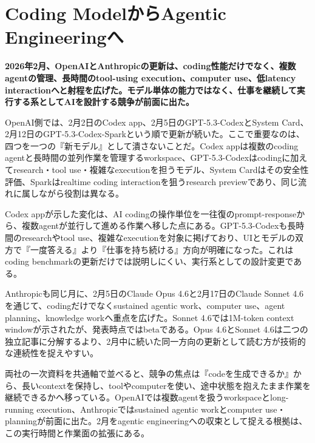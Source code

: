 \section{Coding ModelからAgentic Engineeringへ}
\label{pkg:agentic-engineering-frontier}
\noindent\textbf{2026年2月、OpenAIとAnthropicの更新は、coding性能だけでなく、複数agentの管理、長時間のtool-using execution、computer use、低latency interactionへと射程を広げた。モデル単体の能力ではなく、仕事を継続して実行する系としてAIを設計する競争が前面に出た。}\autocite{src-15823ae5556e,src-9aba7995b6a5,src-f6aa679babd7}

OpenAI側では、2月2日のCodex app、2月5日のGPT-5.3-CodexとSystem Card、2月12日のGPT-5.3-Codex-Sparkという順で更新が続いた。ここで重要なのは、四つを一つの『新モデル』として潰さないことだ。Codex appは複数のcoding agentと長時間の並列作業を管理するworkspace、GPT-5.3-Codexはcodingに加えてresearch・tool use・複雑なexecutionを担うモデル、System Cardはその安全性評価、Sparkはrealtime coding interactionを狙うresearch previewであり、同じ流れに属しながら役割は異なる。\autocite{src-15823ae5556e,src-4a841ea7ec7c,src-9aba7995b6a5,src-dd64fe3084a4}


Codex appが示した変化は、AI codingの操作単位を一往復のprompt-responseから、複数agentが並行して進める作業へ移した点にある。GPT-5.3-Codexも長時間のresearchやtool use、複雑なexecutionを対象に掲げており、UIとモデルの双方で『一度答える』より『仕事を持ち続ける』方向が明確になった。これはcoding benchmarkの更新だけでは説明しにくい、実行系としての設計変更である。\autocite{src-15823ae5556e,src-9aba7995b6a5}


Anthropicも同じ月に、2月5日のClaude Opus 4.6と2月17日のClaude Sonnet 4.6を通じて、codingだけでなくsustained agentic work、computer use、agent planning、knowledge workへ重点を広げた。Sonnet 4.6では1M-token context windowが示されたが、発表時点ではbetaである。Opus 4.6とSonnet 4.6は二つの独立記事に分解するより、2月中に続いた同一方向の更新として読む方が技術的な連続性を捉えやすい。\autocite{src-f6aa679babd7}


両社の一次資料を共通軸で並べると、競争の焦点は『codeを生成できるか』から、長いcontextを保持し、toolやcomputerを使い、途中状態を抱えたまま作業を継続できるかへ移っている。OpenAIでは複数agentを扱うworkspaceとlong-running execution、Anthropicではsustained agentic workとcomputer use・planningが前面に出た。2月をagentic engineeringへの収束として捉える根拠は、この実行時間と作業面の拡張にある。\autocite{src-15823ae5556e,src-9aba7995b6a5,src-f6aa679babd7}


